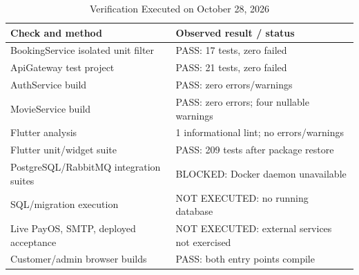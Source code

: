 \begin{table}[t]
\caption{Verification Executed on October 28, 2026}\label{tab:tests}
\centering\footnotesize
\begin{tabularx}{\columnwidth}{@{}YY@{}}\toprule
Check and method & Observed result / status\\\midrule
BookingService isolated unit filter & PASS: 17 tests, zero failed\\
ApiGateway test project & PASS: 21 tests, zero failed\\
AuthService build & PASS: zero errors/warnings\\
MovieService build & PASS: zero errors; four nullable warnings\\
Flutter analysis & 1 informational lint; no errors/warnings\\
Flutter unit/widget suite & PASS: 209 tests after package restore\\
PostgreSQL/RabbitMQ integration suites & BLOCKED: Docker daemon unavailable\\
SQL/migration execution & NOT EXECUTED: no running database\\
Live PayOS, SMTP, deployed acceptance & NOT EXECUTED: external services not exercised\\
Customer/admin browser builds & PASS: both entry points compile\\\bottomrule
\end{tabularx}
\end{table}
